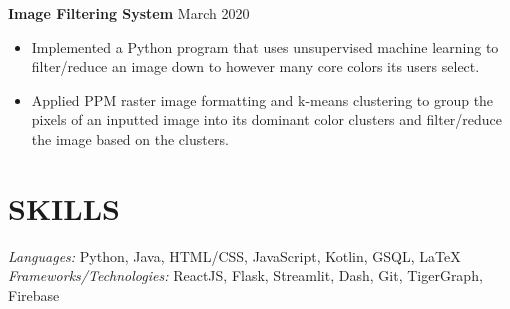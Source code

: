 \documentclass[11pt]{res}
\begin{document}
\begin{footnotesize}
\begin{resume}
\begin{itemize}
\end{itemize}
\vspace{-2.5mm}
\textbf{Image Filtering System} \hfill March 2020\vspace{-5.25mm}
\begin{itemize} \itemsep -2pt
\item Implemented a Python program that uses unsupervised machine learning to filter/reduce an image down to however many core colors its users select.
\vspace{.75mm}
\item Applied PPM raster image formatting and k-means clustering to group the pixels of an inputted image into its dominant color clusters and filter/reduce the image based on the clusters. 
\end{itemize}
\section{SKILLS} 
{\sl Languages:} 
Python, Java, HTML/CSS, JavaScript, Kotlin, GSQL, \LaTeX \\
{\sl Frameworks/Technologies:} ReactJS, Flask, Streamlit, Dash, Git, TigerGraph, Firebase

\end{resume}
\end{footnotesize}
\end{document}
